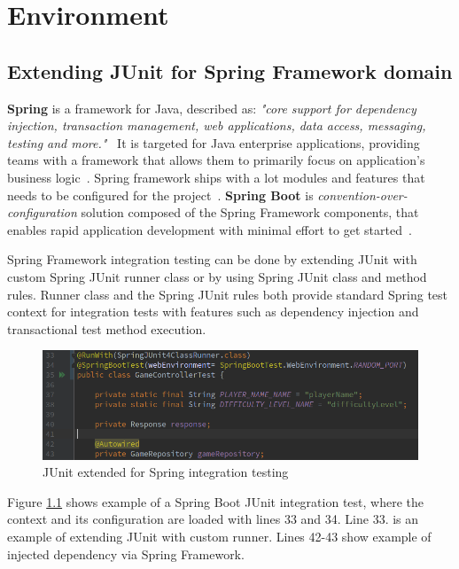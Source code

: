 \chapter{Environment}
\label{chapter:environment}

\section{Extending JUnit for Spring Framework domain}
    \textbf{Spring} is a framework for Java, described as:
    \textit{"core support for dependency injection, transaction management, web applications, data access, messaging, testing and more."}~\cite{spring}
    It is targeted for Java enterprise applications, providing teams with a framework that allows them to primarily focus on
    application's business logic~\cite{spring}. Spring framework ships with a lot modules and features that needs to be
    configured for the project~\cite{wiki:spring}. \textbf{Spring Boot} is \textit{convention-over-configuration} solution
    composed of the Spring Framework components, that enables rapid application development with minimal effort to get started~\cite{wiki:spring}.

    Spring Framework integration testing can be done by extending JUnit with custom Spring JUnit runner class or by using Spring JUnit class and
    method rules. Runner class and the Spring JUnit rules both provide standard Spring test context
    for integration tests with features such as dependency injection and transactional test method execution. ~\cite{springintegration}

    \begin{figure}[ht]
      \begin{center}
        \includegraphics[width=13.5cm]{images/springrunner.png}
        \caption{JUnit extended for Spring integration testing}
        \label{fig:springrunner}
      \end{center}
    \end{figure}

    Figure \ref{fig:springrunner} shows example of a Spring Boot JUnit integration test, where the context and its configuration are
    loaded with lines 33 and 34. Line 33. is an example of extending JUnit with custom runner. Lines 42-43 show example of injected dependency
    via Spring Framework.

